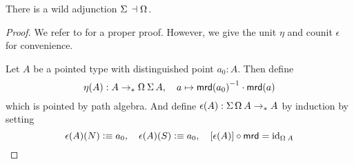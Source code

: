 \documentclass[english,a4]{article}
\def\githubpath{\tt\small}
\renewcommand{\ap}[1]{\left[{#1}\right]}
\newcommand{\ptdto}{\to_\ast}%
\begin{document}
\begin{proposition}
  There is a wild adjunction $\susp \null \leftadjto \loopspace \null$.
  \label{prop:susp-loop-adjunction}
\end{proposition}
\begin{proof}
  We refer to \cite[\githubpath
  theorems/homotopy/SuspAdjointLoop.agda]{hott-agda} for a proper proof.
  However, we give the unit $\eta$ and counit $\epsilon$ for convenience.

  Let $A$ be a pointed type with distinguished point $a_0:A$. Then define
  \begin{displaymath}
    \eta(A) : A \ptdto \loopspace\null\susp A, \quad
    a \mapsto \inv{\mrd(a_0)} \cdot \mrd(a)
  \end{displaymath}
  which is pointed by path algebra.
  And define $\epsilon(A) : \susp \loopspace \null A \ptdto A$ by induction by
  setting
  \begin{displaymath}
    \epsilon(A)(N) \defequi a_0,\quad
    \epsilon(A)(S) \defequi a_0,\quad
    \ap{\epsilon(A)}\circ \mrd = \id_{\loopspace\null A}
  \end{displaymath}

\end{proof}
\end{document}
